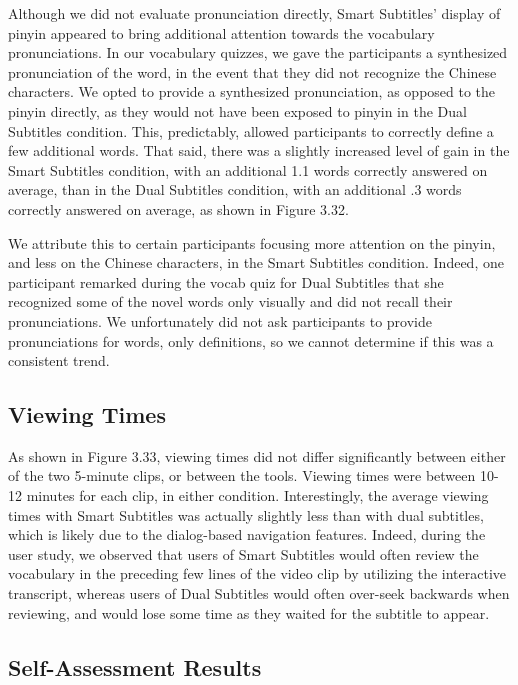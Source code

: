 \documentclass{sigchi}
\begin{document}
Although we did not evaluate pronunciation directly, Smart Subtitles' display of pinyin appeared to bring additional attention towards the vocabulary pronunciations. In our vocabulary quizzes, we gave the participants a synthesized pronunciation of the word, in the event that they did not recognize the Chinese characters. We opted to provide a synthesized pronunciation, as opposed to the pinyin directly, as they would not have been exposed to pinyin in the Dual Subtitles condition. This, predictably, allowed participants to correctly define a few additional words. That said, there was a slightly increased level of gain in the Smart Subtitles condition, with an additional 1.1 words correctly answered on average, than in the Dual Subtitles condition, with an additional .3 words correctly answered on average, as shown in Figure 3.32.

We attribute this to certain participants focusing more attention on the pinyin, and less on the Chinese characters, in the Smart Subtitles condition. Indeed, one participant remarked during the vocab quiz for Dual Subtitles that she recognized some of the novel words only visually and did not recall their pronunciations. We unfortunately did not ask participants to provide pronunciations for words, only definitions, so we cannot determine if this was a consistent trend.

\subsection{Viewing Times}

As shown in Figure 3.33, viewing times did not differ significantly between either of the two 5-minute clips, or between the tools. Viewing times were between 10-12 minutes for each clip, in either condition. Interestingly, the average viewing times with Smart Subtitles was actually slightly less than with dual subtitles, which is likely due to the dialog-based navigation features. Indeed, during the user study, we observed that users of Smart Subtitles would often review the vocabulary in the preceding few lines of the video clip by utilizing the interactive transcript, whereas users of Dual Subtitles would often over-seek backwards when reviewing, and would lose some time as they waited for the subtitle to appear.

\subsection{Self-Assessment Results}
\end{document}
